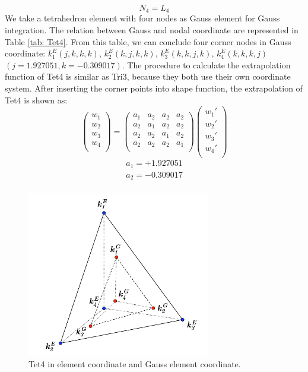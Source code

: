\begin{equation}
N_4 = L_4
\end{equation}
 We take a tetrahedron element with four nodes as Gauss element for Gauss integration. The relation between Gauss and nodal coordinate are represented in Table \ref{tab: Tet4}. From this table, we can conclude four corner nodes in Gauss coordinate: $k_1^E(j, k, k, k)$, $k_2^E(k, j, k, k)$, $k_3^E(k, k, j, k)$, $k_4^E(k, k, k, j)$ $(j=1.927051, k=-0.309017)$. The procedure to calculate the extrapolation function of Tet4 is similar as Tri3, because they both use their own coordinate system. After inserting the corner points into shape function, the extrapolation of Tet4 is shown as:
\begin{equation}
\begin{pmatrix}
w_1 \\
w_2 \\
w_3 \\
w_4 \\
\end{pmatrix} = \begin{pmatrix}
a_1 & a_2 &  a_2 &  a_2      \\[0.3em]
a_2 & a_1 &  a_2 &  a_2      \\[0.3em]
a_2 & a_2 &  a_1 &  a_2      \\[0.3em]
a_2 & a_2 &  a_2 &  a_1      \\[0.3em]
\end{pmatrix} \begin{pmatrix}
{w_1}' \\
{w_2}' \\
{w_3}' \\
{w_4}' \\
\end{pmatrix}
\end{equation}	
\begin{align*}
a_1 = +1.927051 \\
a_2 = -0.309017 \\
\end{align*}


\begin{figure}[h]
	\begin{center}
		\includegraphics[width=8cm,clip]{Tet4_1.pdf}			
		\caption{Tet4 in element coordinate and Gauss element coordinate.} \label{fig: Tet4_1}
	\end{center} 
\end{figure}

